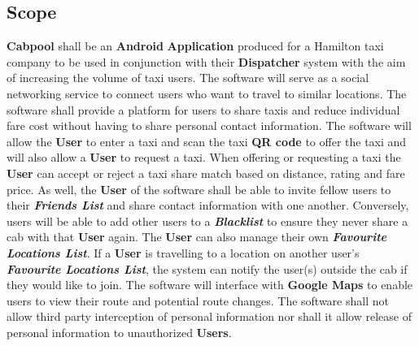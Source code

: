 \documentclass[english]{article}
\begin{document}
\subsection{Scope}
\label{sub:scope}
\textbf{Cabpool} shall be an \textbf{Android} \textbf{Application} produced for a Hamilton taxi company to be used in conjunction with their \textbf{Dispatcher} system with the aim of increasing the volume of taxi users. The software will serve as a social networking service to connect users who want to travel to similar locations. The software shall provide a platform for users to share taxis and reduce individual fare cost without having to share personal contact information. The software will allow the \textbf{User} to enter a taxi and scan the taxi \textbf{QR code} to offer the taxi and will also allow a \textbf{User} to request a taxi. When offering or requesting a taxi the \textbf{User} can accept or reject a taxi share match based on distance, rating and fare price. As well, the \textbf{User} of the software shall be able to invite fellow users to their \textbf{\emph{Friends List}} and share contact information with one another. Conversely, users will be able to add other users to a \textbf{\emph{Blacklist}} to ensure they never share a cab with that \textbf{User} again. The \textbf{User} can also manage their own \textbf{\emph{Favourite Locations List}}. If a \textbf{User} is travelling to a location on another user's \textbf{\emph{Favourite Locations List}}, the system can notify the user(s) outside the cab if they would like to join. The software will interface with \textbf{Google Maps} to enable users to view their route and potential route changes. The software shall not allow third party interception of personal information nor shall it allow release of personal information to unauthorized \textbf{Users}. 


\end{document}
